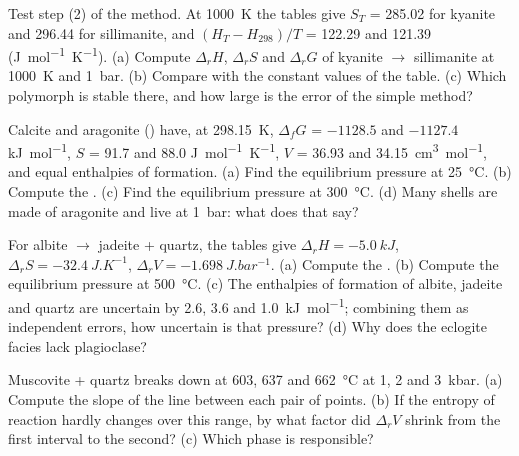 \begin{exercise}[$\star\star$]\label{exo:b2:metamorphic-facies:6}
Test step (2) of the method. At \qty{1000}{K} the tables give $S_T$ = 285.02 for kyanite
and 296.44 for sillimanite, and $(H_T - H_{298})/T$ = 122.29 and 121.39
(\unit{J.mol^{-1}.K^{-1}}). (a) Compute $\Delta_r H$, $\Delta_r S$ and $\Delta_r G$ of
kyanite $\to$ sillimanite at \qty{1000}{K} and \qty{1}{bar}. (b) Compare with the constant
values of the table. (c) Which polymorph is stable there, and how large is the error of
the simple method?
\end{exercise}

\begin{exercise}[$\star\star$]\label{exo:b2:metamorphic-facies:7}
Calcite and aragonite () have, at \qty{298.15}{K}, $\Delta_f G$ = $-1128.5$ and
$-1127.4$ \unit{kJ.mol^{-1}}, $S$ = 91.7 and 88.0 \unit{J.mol^{-1}.K^{-1}}, $V$ = 36.93
and \qty{34.15}{cm^3.mol^{-1}}, and equal enthalpies of formation. (a) Find the
equilibrium pressure at \qty{25}{\celsius}. (b) Compute the . (c) Find the
equilibrium pressure at \qty{300}{\celsius}. (d) Many shells are made of aragonite and
live at \qty{1}{bar}: what does that say?
\end{exercise}

\begin{exercise}[$\star\star$]\label{exo:b2:metamorphic-facies:8}
For albite $\to$ jadeite + quartz, the tables give $\Delta_r H = \qty{-5.0}{kJ}$,
$\Delta_r S = \qty{-32.4}{J.K^{-1}}$, $\Delta_r V = \qty{-1.698}{J.bar^{-1}}$. (a)
Compute the . (b) Compute the equilibrium pressure at \qty{500}{\celsius}.
(c) The enthalpies of formation of albite, jadeite and quartz are uncertain by 2.6, 3.6
and \qty{1.0}{kJ.mol^{-1}}; combining them as independent errors, how uncertain is that
pressure? (d) Why does the eclogite facies lack plagioclase?
\end{exercise}

\begin{exercise}[$\star\star$]\label{exo:b2:metamorphic-facies:9}
Muscovite + quartz breaks down at 603, 637 and \qty{662}{\celsius} at 1, 2 and
\qty{3}{kbar}. (a) Compute the slope of the line between each pair of points. (b) If the
entropy of reaction hardly changes over this range, by what factor did $\Delta_r V$
shrink from the first interval to the second? (c) Which phase is responsible?
\end{exercise}

